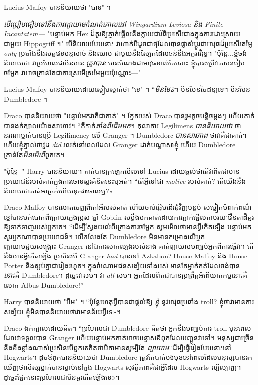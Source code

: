 {{Lucius Malfoy បាននិយាយថា "បាទ" ។

\emph{បើប្រៀបធៀបទៅនឹងការព្យាយាមកំណត់គោលដៅ Wingardium Leviosa និង Finite Incantatem—} "បន្ទាប់មក Hex ដ៏គួរឱ្យភ្ញាក់ផ្អើលនឹងក្លាយជាវិធីប្រសើរជាងក្នុងការដោះស្រាយជាមួយ Hippogriff ។" បើនិយាយបែបនោះ វាហាក់បីដូចជាថ្មដែលបានផ្លាស់ប្តូរជាអាវុធដ៏ប្រសើរតម្លៃ \emph{ only} ប្រឆាំងនឹងសត្វវេទមន្តសាច់ និងឈាម ជាមួយនឹងស្បែកដែលធន់នឹងអក្ខរាវិរុទ្ធ។ "ប៉ុន្តែ...ខ្ញុំចង់និយាយថា វាប្រហែលជាមិនមាន \emph{ត្រូវបាន} មានបំណងជាអាវុធទាល់តែសោះ ខ្ញុំបានប្រើវាតាមរបៀបចម្លែក វាអាចគ្រាន់តែជាការស្រមើស្រមៃមួយប៉ុណ្ណោះ—"

Lucius Malfoy បាននិយាយដោយស្ងៀមស្ងាត់ថា "ទេ" ។ “\emph{មិន​មែន​}។ មិនមែនចៃដន្យទេ។ មិនមែន Dumbledore ។

Draco បាននិយាយថា "បន្ទាប់មកវាគឺជាគាត់" ។ ភ្នែករបស់ Draco បានរួមតូចបន្តិចម្តងៗ ហើយគាត់បានងក់ក្បាលយ៉ាងសាហាវ។ “គឺគាត់\emph{តាំងពីដើមមក}។ តុលាការ Legilimens \emph{បាននិយាយថា} ថានរណាម្នាក់បានប្រើ Legilimency លើ Granger ។ Dumbledore \emph{បានសារភាព} ថាវាគឺជាគាត់។ ហើយខ្ញុំភ្នាល់ថាវួដ \emph{did} រលត់នៅពេលដែល Granger ដាក់បណ្តាសាខ្ញុំ ហើយ Dumbledore គ្រាន់តែ\emph{មិនអើពើ}ពួកគេ។

"ប៉ុន្តែ -" Harry បាននិយាយ។ គាត់បានក្រឡេកមើលទៅ Lucius ដោយឆ្ងល់ថាតើវាពិតជាមានប្រយោជន៍របស់គាត់ក្នុងការចោទសួរគំនិតនេះឬអត់។ “តើអ្វីទៅជា \emph{motive} របស់គាត់? តើ​យើង​នឹង​និយាយ​ថា​គាត់​អាក្រក់​ហើយ​ទុក​វា​ចោល​ឬ?»

Draco Malfoy បានលោតចេញពីកៅអីរបស់គាត់ ហើយចាប់ផ្តើមដើរជុំវិញបន្ទប់ សម្លៀកបំពាក់ពណ៌ខ្មៅបានបក់បោកពីក្រោយក្មេងប្រុស ឆ្មាំ Goblin សម្លឹងមកគាត់ដោយការភ្ញាក់ផ្អើលតាមរយៈវ៉ែនតាដ៏គួរឱ្យទាក់ទាញរបស់ពួកគេ។ “ដើម្បី​ស្វែង​យល់​ពី​គ្រោង​ការ​ចម្លែក សូម​មើល​ថា​មាន​អ្វី​កើត​ឡើង បន្ទាប់​មក​សួរ​អ្នក​ណា​បាន​ប្រយោជន៍។ លើកលែងតែ Dumbledore មិនមានគម្រោងលើអ្នកព្យាយាមជួយសង្គ្រោះ Granger នៅឯការសាកល្បងរបស់នាង គាត់ព្យាយាមបញ្ឈប់អ្នកពីការធ្វើវា។ តើនឹងមានអ្វីកើតឡើង ប្រសិនបើ Granger \emph{had} បានទៅ Azkaban? House Malfoy និង House Potter នឹងស្អប់គ្នាជារៀងរហូត។ ក្នុងចំណោមជនសង្ស័យទាំងអស់ មានតែម្នាក់គត់ដែលចង់បាន\emph{នោះ}គឺ Dumbledore។ ដូច្នេះវាសម។ វា \emph{all} សម។ អ្នក​ដែល​ពិតជា​បាន​ប្រព្រឹត្ត​អំពើ​ឃាតកម្ម​នោះ​គឺ​លោក Albus Dumbledore!”

Harry បាននិយាយថា "អឹម" ។ “ប៉ុន្តែហេតុអ្វីបានជាផ្តល់ឱ្យ \emph{ខ្ញុំ} នូវអាវុធប្រឆាំង troll? ខ្ញុំ​ថា​វា​មាន​ការ​សង្ស័យ ខ្ញុំ​មិន​បាន​និយាយ​ថា​វា​មាន​ន័យ​អ្វី​ទេ»។

Draco ងក់ក្បាលដោយគិត។ “ប្រហែលជា Dumbledore គិតថា អ្នកនឹងបញ្ឈប់ការ troll មុនពេលដែលវាទទួលបាន Granger ហើយបន្ទាប់មកគាត់អាចបន្ទោសឪពុកដែលបញ្ជូនវាទៅ។ មនុស្ស​ជា​ច្រើន​នឹង​ខឹង​ខ្លាំង​ណាស់​ប្រសិន​បើ​ពួកគេ​គិត​ថា​បិតា​មាន​សូម្បី​តែ \emph{ព្យាយាម} ដើម្បី​ធ្វើ​រឿង​បែប​នោះ​នៅ Hogwarts។ ដូចឪពុកបាននិយាយថា Dumbledore ត្រូវតែបាត់បង់មុខនៅពេលដែលមនុស្សបានរកឃើញថាសិស្សម្នាក់បានស្លាប់នៅក្នុង Hogwarts សុវត្ថិភាពគឺជាអ្វីដែល Hogwarts ល្បីល្បាញ។ ដូច្នេះ​ផ្នែក​នោះ​ប្រហែល​ជា​មិន​គួរ​កើត​ឡើង​ទេ»។

}}
